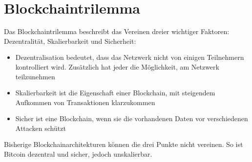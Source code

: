 \section{Blockchaintrilemma}
Das Blockchaintrilemma beschreibt das Vereinen dreier wichtiger Faktoren: Dezentralität, Skalierbarkeit und Sicherheit:

\begin{itemize}
    \item Dezentralisation bedeutet, dass das Netzwerk nicht von einigen Teilnehmern kontrolliert wird. Zusätzlich hat jeder die Möglichkeit, am Netzwerk teilzunehmen
    \item Skalierbarkeit ist die Eigenschaft einer Blockchain, mit steigendem Aufkommen von Transaktionen klarzukommen
    \item Sicher ist eine Blockchain, wenn sie die vorhandenen  Daten vor verschiedenen Attacken schützt
\end{itemize}

Bisherige Blockchainarchitekturen können die drei Punkte nicht vereinen. So ist Bitcoin dezentral und sicher, jedoch unskalierbar. \cite{Abadi.2018}